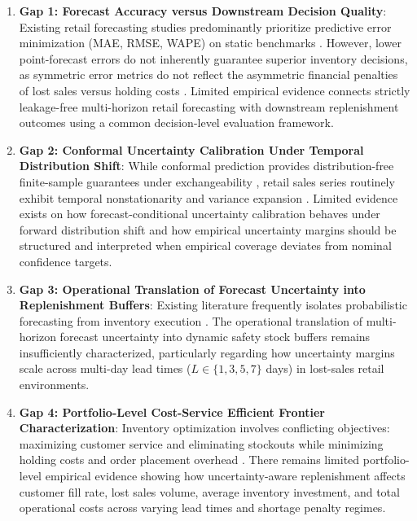 \begin{enumerate}
    \item \textbf{Gap 1: Forecast Accuracy versus Downstream Decision Quality}: Existing retail forecasting studies predominantly prioritize predictive error minimization (MAE, RMSE, WAPE) on static benchmarks \cite{makridakis2022m5, hobor2026comparative}. However, lower point-forecast errors do not inherently guarantee superior inventory decisions, as symmetric error metrics do not reflect the asymmetric financial penalties of lost sales versus holding costs \cite{ban2019big, bertsimas2020predictive}. Limited empirical evidence connects strictly leakage-free multi-horizon retail forecasting with downstream replenishment outcomes using a common decision-level evaluation framework.
    \item \textbf{Gap 2: Conformal Uncertainty Calibration Under Temporal Distribution Shift}: While conformal prediction provides distribution-free finite-sample guarantees under exchangeability \cite{vovk2005algorithmic, angelopoulos2021gentle}, retail sales series routinely exhibit temporal nonstationarity and variance expansion \cite{barber2023conformal}. Limited evidence exists on how forecast-conditional uncertainty calibration behaves under forward distribution shift and how empirical uncertainty margins should be structured and interpreted when empirical coverage deviates from nominal confidence targets.
    \item \textbf{Gap 3: Operational Translation of Forecast Uncertainty into Replenishment Buffers}: Existing literature frequently isolates probabilistic forecasting from inventory execution \cite{stankeviciute2021conformal, huber2019integrating}. The operational translation of multi-horizon forecast uncertainty into dynamic safety stock buffers remains insufficiently characterized, particularly regarding how uncertainty margins scale across multi-day lead times ($L \in \{1, 3, 5, 7\}$ days) in lost-sales retail environments.
    \item \textbf{Gap 4: Portfolio-Level Cost-Service Efficient Frontier Characterization}: Inventory optimization involves conflicting objectives: maximizing customer service and eliminating stockouts while minimizing holding costs and order placement overhead \cite{silver1998inventory}. There remains limited portfolio-level empirical evidence showing how uncertainty-aware replenishment affects customer fill rate, lost sales volume, average inventory investment, and total operational costs across varying lead times and shortage penalty regimes.
\end{enumerate}

